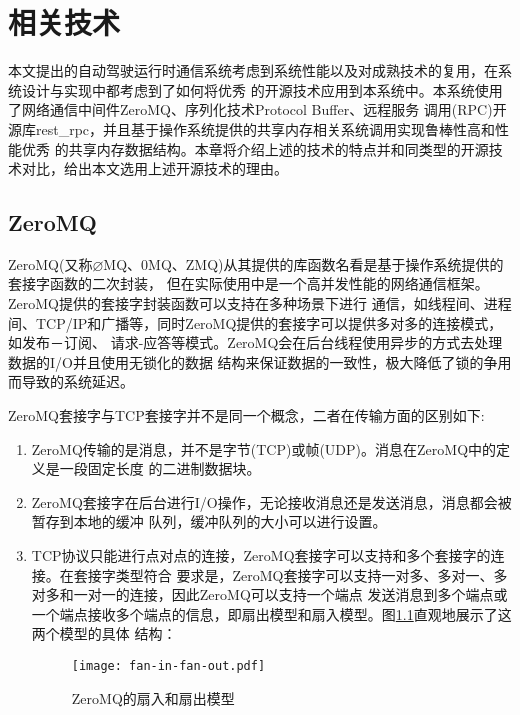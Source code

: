 \chapter{相关技术}
本文提出的自动驾驶运行时通信系统考虑到系统性能以及对成熟技术的复用，在系统设计与实现中都考虑到了如何将优秀
的开源技术应用到本系统中。本系统使用了网络通信中间件ZeroMQ、序列化技术Protocol Buffer、远程服务
调用(RPC)开源库rest\_rpc，并且基于操作系统提供的共享内存相关系统调用实现鲁棒性高和性能优秀
的共享内存数据结构。本章将介绍上述的技术的特点并和同类型的开源技术对比，给出本文选用上述开源技术的理由。
\section{ZeroMQ}
ZeroMQ(又称$\varnothing$MQ、0MQ、ZMQ)从其提供的库函数名看是基于操作系统提供的套接字函数的二次封装\cite{wangpeng}，
但在实际使用中是一个高并发性能的网络通信框架。ZeroMQ提供的套接字封装函数可以支持在多种场景下进行
通信，如线程间、进程间、TCP/IP和广播等，同时ZeroMQ提供的套接字可以提供多对多的连接模式，如发布－订阅、
请求-应答等模式\cite{pfp}。ZeroMQ会在后台线程使用异步的方式去处理数据的I/O并且使用无锁化的数据
结构来保证数据的一致性，极大降低了锁的争用而导致的系统延迟\cite{swp}。

ZeroMQ套接字与TCP套接字并不是同一个概念，二者在传输方面的区别如下:
\begin{enumerate}
    \item ZeroMQ传输的是消息，并不是字节(TCP)或帧(UDP)。消息在ZeroMQ中的定义是一段固定长度
    的二进制数据块。
    \item ZeroMQ套接字在后台进行I/O操作，无论接收消息还是发送消息，消息都会被暂存到本地的缓冲
    队列，缓冲队列的大小可以进行设置。
    \item TCP协议只能进行点对点的连接，ZeroMQ套接字可以支持和多个套接字的连接。在套接字类型符合
    要求是，ZeroMQ套接字可以支持一对多、多对一、多对多和一对一的连接，因此ZeroMQ可以支持一个端点
    发送消息到多个端点或一个端点接收多个端点的信息，即扇出模型和扇入模型。图\ref{fan-in-fan-out}直观地展示了这两个模型的具体
    结构：
    \begin{figure}[H]
        \centering
        \texttt{[image: fan-in-fan-out.pdf]}
        \caption{ZeroMQ的扇入和扇出模型}
        \label{fan-in-fan-out}
      \end{figure}
\end{enumerate}

